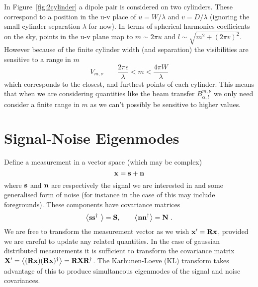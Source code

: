 \documentclass[onecolumn]{revtex4}
\begin{document}
In Figure~\ref{fig:2cylinder} a dipole pair is considered on two
cylinders. These correspond to a position in the u-v place of $u = W / \lambda$
and $v = D / \lambda$ (ignoring the small cylinder separation $\lambda$ for
now). In terms of spherical harmonics coefficients on the sky, points in the u-v
plane map to $m \sim 2\pi u$ and $l \sim \sqrt{m^2 + (2\pi v)^2}$. However
because of the finite cylinder width (and separation) the visibilities are
sensitive to a range in $m$
\begin{equation}
  V_{m,\nu} \qquad \frac{2 \pi \epsilon}{\lambda} < m < \frac{4 \pi
    W}{\lambda}
\end{equation}
which corresponds to the closest, and furthest points of each cylinder. This
means that when we are considering quantities like the beam transfer
$B_{\alpha,l}^{m,\nu}$ we only need consider a finite range in $m$ as we can't
possibly be sensitive to higher values.

\appendix


\section{Signal-Noise Eigenmodes}



\noindent
Define a measurement in a vector space (which may be complex)
\begin{equation}
\mathbf{x} = \mathbf{s} + \mathbf{n}
\end{equation}
where $\mathbf{s}$ and $\mathbf{n}$ are respectively the signal we are interested in and some
generalised form of noise (for instance in the case of \tcm this may include
foregrounds). These components have covariance matrices
\begin{equation}
\left\langle \mathbf{s} \mathbf{s}^{\dagger}\ \right\rangle = \mathbf{S}, \qquad \left\langle \mathbf{n} \mathbf{n}^{\dagger} \right\rangle = \mathbf{N} \; .
\end{equation}
We are free to transform the measurement vector as we wish $\mathbf{x}' = \mathbf{R}\mathbf{x}$,
provided we are careful to update any related quantities. In the case of
gaussian distributed measurements it is sufficient to transform the covariance
matrix $\mathbf{X}' = \left\langle (\mathbf{R} \mathbf{x}) (\mathbf{R} \mathbf{x})^{\dagger} \right\rangle = \mathbf{R}
\mathbf{X}\mathbf{R}^{\dagger}$. The Karhunen-Loeve (KL) transform takes advantage of this to
produce simultaneous eigenmodes of the signal and noise covariances.
\end{document}
